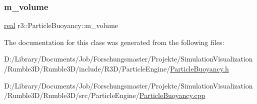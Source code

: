 \mbox{\label{classr3_1_1_particle_buoyancy_ade7d34f053371dadc2113563760599c9}} 
\subsubsection{\texorpdfstring{m\+\_\+volume}{m\_volume}}
{\footnotesize\ttfamily \mbox{\hyperlink{namespacer3_ab2016b3e3f743fb735afce242f0dc1eb}{real}} r3\+::\+Particle\+Buoyancy\+::m\+\_\+volume\hspace{0.3cm}{\ttfamily [protected]}}



The documentation for this class was generated from the following files\+:\begin{DoxyCompactItemize}
\item 
D\+:/\+Library/\+Documents/\+Job/\+Forschungsmaster/\+Projekte/\+Simulation\+Visualization/\+Rumble3\+D/\+Rumble3\+D/include/\+R3\+D/\+Particle\+Engine/\mbox{\hyperlink{_particle_buoyancy_8h}{Particle\+Buoyancy.\+h}}\item 
D\+:/\+Library/\+Documents/\+Job/\+Forschungsmaster/\+Projekte/\+Simulation\+Visualization/\+Rumble3\+D/\+Rumble3\+D/src/\+Particle\+Engine/\mbox{\hyperlink{_particle_buoyancy_8cpp}{Particle\+Buoyancy.\+cpp}}\end{DoxyCompactItemize}
